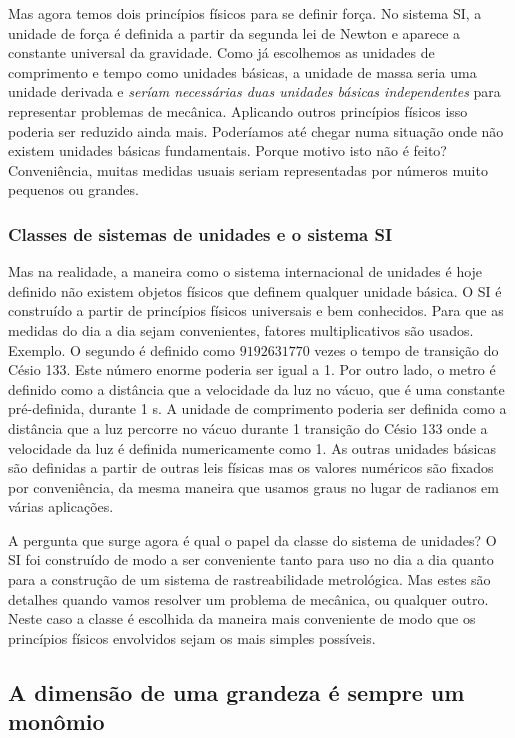 Mas agora temos dois princípios físicos para se definir força. No sistema SI, a unidade de força é definida a partir da segunda lei de Newton e aparece a constante universal da gravidade. Como já escolhemos as unidades de comprimento e tempo como unidades básicas, a unidade de massa seria uma unidade derivada e \emph{seríam necessárias duas unidades básicas independentes} para representar problemas de mecânica. Aplicando outros princípios físicos isso poderia ser reduzido ainda mais. Poderíamos até chegar numa situação onde não existem unidades básicas fundamentais. Porque motivo isto não é feito? Conveniência, muitas medidas usuais seriam representadas por números muito pequenos ou grandes.

\subsubsection{Classes de sistemas de unidades e o sistema SI}

Mas na realidade, a maneira como o sistema internacional de unidades é hoje definido não existem objetos físicos que definem qualquer unidade básica. O SI é construído a partir de princípios físicos universais e bem conhecidos. Para que as medidas do dia a dia sejam convenientes, fatores multiplicativos são usados. Exemplo. O segundo é definido como $9 192 631 770$ vezes o tempo de transição do Césio 133. Este número enorme poderia ser igual a 1. Por outro lado, o metro é definido como a distância que a velocidade da luz no vácuo, que é uma constante pré-definida, durante 1 s. A unidade de comprimento poderia ser definida como a distância que a luz percorre no vácuo durante 1 transição do Césio 133 onde a velocidade da luz é definida numericamente como 1. As outras unidades básicas são definidas a partir de outras leis físicas mas os valores numéricos são fixados por conveniência, da mesma maneira que usamos graus no lugar de radianos em várias aplicações.

A pergunta que surge agora é qual o papel da classe do sistema de unidades? O SI  foi construído de modo a ser conveniente tanto para uso no dia a dia quanto para a construção de um sistema de rastreabilidade metrológica. Mas estes são detalhes quando vamos resolver um problema de mecânica, ou qualquer outro. Neste caso a classe é escolhida da maneira mais conveniente de modo que os princípios físicos envolvidos sejam os mais simples possíveis. 






\subsection{A dimensão de uma grandeza é sempre um monômio}

